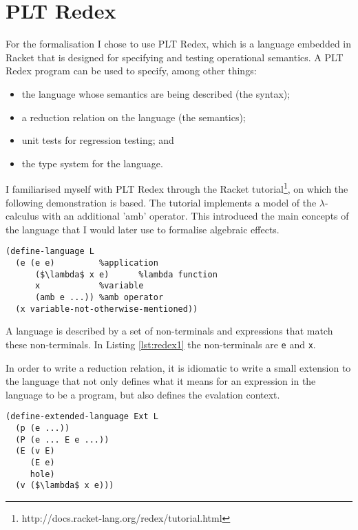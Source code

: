 \documentclass[12pt,a4paper,twoside,openright]{report}
\begin{document}
\section{PLT Redex}\label{prepplt}

For the formalisation I chose to use PLT Redex, which is a language embedded in Racket that is designed for specifying and testing operational semantics. A PLT Redex program can be used to specify, among other things:

\begin{itemize}
\item the language whose semantics are being described (the syntax);
\item a reduction relation on the language (the semantics);
\item unit tests for regression testing; and
\item the type system for the language.
\end{itemize}

I familiarised myself with PLT Redex through the Racket tutorial\footnote{http://docs.racket-lang.org/redex/tutorial.html}, on which the following demonstration is based. The tutorial implements a model of the $\lambda$-calculus with an additional 'amb' operator. This introduced the main concepts of the language that I would later use to formalise algebraic effects.

\begin{lstlisting}[caption=Defining a language in PLT Redex,label={lst:redex1}]
(define-language L
  (e (e e)         %application
      ($\lambda$ x e)      %lambda function
      x            %variable
      (amb e ...)) %amb operator
  (x variable-not-otherwise-mentioned))
\end{lstlisting}

A language is described by a set of non-terminals and expressions that match these non-terminals. In Listing \ref{lst:redex1} the non-terminals are \texttt{e} and \texttt{x}.

In order to write a reduction relation, it is idiomatic to write a small extension to the language that not only defines what it means for an expression in the language to be a program, but also defines the evalation context.

\begin{lstlisting}[caption=An extended language based on L,label={lst:redex2}]
(define-extended-language Ext L
  (p (e ...))
  (P (e ... E e ...))
  (E (v E)
     (E e)
     hole)
  (v ($\lambda$ x e)))
\end{lstlisting}
\end{document}
